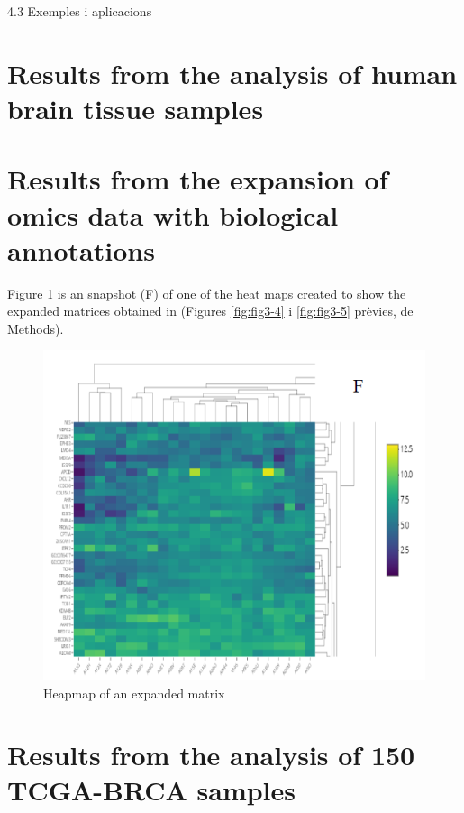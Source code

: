 \documentclass[a4paper, nobind]{templates/ociamthesis}
\begin{document}
4.3 Exemples i aplicacions

\hypertarget{results-from-the-analysis-of-human-brain-tissue-samples}{%
\section{Results from the analysis of human brain tissue samples}\label{results-from-the-analysis-of-human-brain-tissue-samples}}

\hypertarget{results-from-the-expansion-of-omics-data-with-biological-annotations}{%
\section{Results from the expansion of omics data with biological annotations}\label{results-from-the-expansion-of-omics-data-with-biological-annotations}}

Figure \ref{fig:fig4-1} is an snapshot (F) of one of the heat maps created to show the expanded matrices obtained in (Figures \ref{fig:fig3-4} i \ref{fig:fig3-5} prèvies, de Methods).

\begin{figure}

{\centering \includegraphics[width=0.95\linewidth]{figures/chapter4/4-1_heatmap_expanded} 

}

\caption{Heapmap of an expanded matrix}\label{fig:fig4-1}
\end{figure}

\hypertarget{results-from-the-analysis-of-150-tcga-brca-samples}{%
\section{Results from the analysis of 150 TCGA-BRCA samples}\label{results-from-the-analysis-of-150-tcga-brca-samples}}
\end{document}
